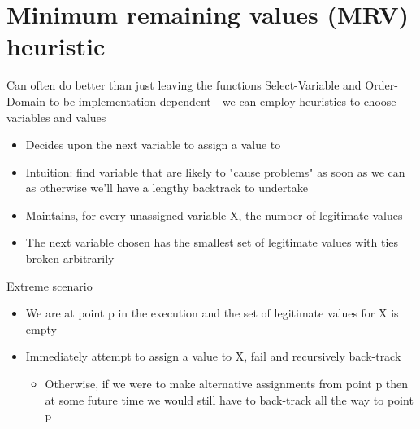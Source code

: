 \documentclass{article}[18pt]
\begin{document}
\section{Minimum remaining values (MRV) heuristic}
Can often do better than just leaving the functions Select-Variable and Order-Domain to be implementation dependent - we can employ heuristics to choose variables and values
\begin{defin}
\begin{itemize}
	\item Decides upon the next variable to assign a value to
	\item Intuition: find variable that are likely to "cause problems" as soon as we can as otherwise we'll have a lengthy backtrack to undertake
	\item Maintains, for every unassigned variable X, the number of legitimate values
	\item The next variable chosen has the smallest set of legitimate values with ties broken arbitrarily
\end{itemize}
\end{defin}
Extreme scenario
\begin{itemize}
	\item We are at point p in the execution and the set of legitimate values for X is empty
	\item Immediately attempt to assign a value to X, fail and recursively back-track
	\begin{itemize}
		\item Otherwise, if we were to make alternative assignments from point p then at some future time we would still have to back-track all the way to point p
	\end{itemize}
\end{itemize}
\end{document}
